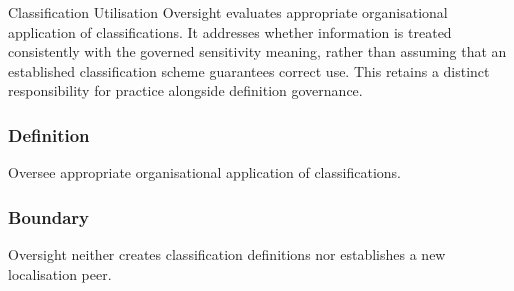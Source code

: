 Classification Utilisation Oversight evaluates appropriate organisational application of classifications. It addresses whether information is treated consistently with the governed sensitivity meaning, rather than assuming that an established classification scheme guarantees correct use. This retains a distinct responsibility for practice alongside definition governance.

\subsubsection*{Definition}

Oversee appropriate organisational application of classifications.

\subsubsection*{Boundary}

Oversight neither creates classification definitions nor establishes a new localisation peer.

